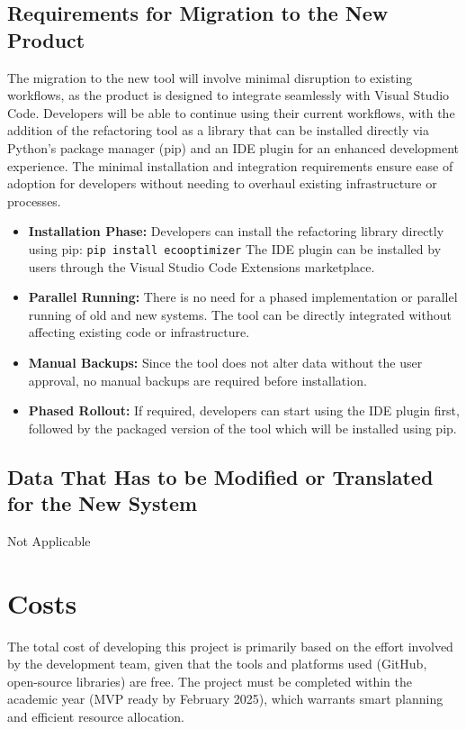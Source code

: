 \documentclass[12pt]{article}
\begin{document}
\subsection{Requirements for Migration to the New Product}
The migration to the new tool will involve minimal disruption to
existing workflows, as the product is designed to integrate
seamlessly with Visual Studio Code. Developers will be able to
continue using their current workflows, with the addition of the
refactoring tool as a library that can be installed directly via
Python's package manager (pip) and an IDE plugin for an enhanced
development experience. The minimal installation and integration
requirements ensure ease of adoption for developers without needing
to overhaul existing infrastructure or processes.
\begin{itemize}
  \item \textbf{Installation Phase:}
    Developers can install the refactoring library directly using pip:
    \verb|pip install ecooptimizer|
    The IDE plugin can be installed by users through the Visual
    Studio Code Extensions marketplace.
  \item \textbf{Parallel Running:}
    There is no need for a phased implementation or parallel running
    of old and new systems. The tool can be directly integrated
    without affecting existing code or infrastructure.
  \item \textbf{Manual Backups:}
    Since the tool does not alter data without the user approval, no manual backups are required 
    before installation.
  \item \textbf{Phased Rollout:}
    If required, developers can start using the IDE plugin first, followed by the packaged version
    of the tool which will be installed using pip.
\end{itemize}
\subsection{Data That Has to be Modified or Translated for the New System}
Not Applicable

\section{Costs}
The total cost of developing this project is primarily based on the
effort involved by the development team, given that the tools and
platforms used (GitHub, open-source libraries) are free. The project
must be completed within the academic year (MVP ready by February
2025), which warrants smart planning and efficient resource allocation.
\end{document}
